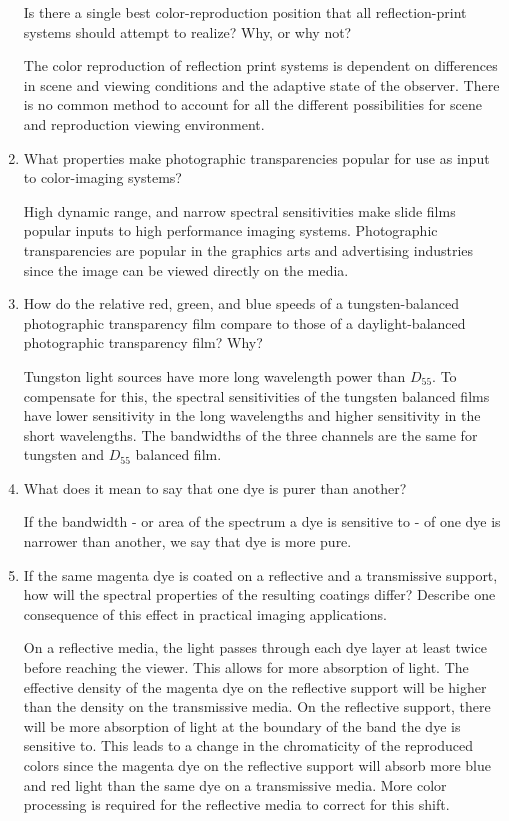 \begin{enumerate}
  Is there a single best color-reproduction position that all reflection-print systems should attempt to realize? Why, or why not? \newline
 \par  The color reproduction of reflection print systems is dependent on differences in scene and viewing conditions and the adaptive state of the observer.  There is no common method to account for all the different possibilities for scene and reproduction viewing environment.
 \item
 What properties make photographic transparencies popular for use as input to color-imaging systems? \newline
 \par High dynamic range, and narrow spectral sensitivities make slide films popular inputs to high performance imaging systems.  Photographic transparencies are popular in the graphics arts and advertising industries since the image can be viewed directly on the media. \newline
 \item
  How do the relative red, green, and blue speeds of a tungsten-balanced photographic transparency film compare to those of a daylight-balanced photographic transparency film? Why? \newline
 \par Tungston light sources have more long wavelength power than $D_{55}$.  To compensate for this, the spectral sensitivities of the tungsten balanced films have lower sensitivity in the long wavelengths and higher sensitivity in the short wavelengths.  The bandwidths of the three channels are the same for tungsten and $D_{55}$ balanced film. \newline
 \item
  What does it mean to say that one dye is purer than another? \newline
 \par If the bandwidth - or area of the spectrum a dye is sensitive to - of one dye is narrower than another, we say that dye is more pure. \newline
 \item
   If the same magenta dye is coated on a reflective and a transmissive support, how will the spectral properties of the resulting coatings differ? Describe one consequence of this effect in practical imaging applications. \newline
 \par On a reflective media, the light passes through each dye layer at least twice before reaching the viewer.  This allows for more absorption of light.  The effective density of the magenta dye on the reflective support will be higher than the density on the transmissive media. On the reflective support, there will be more absorption of light at the boundary of the band the dye is sensitive to.  This leads to a change in the chromaticity of the reproduced colors since the magenta dye on the reflective support will absorb more blue and red light than the same dye on a transmissive media.  More color processing is required for the reflective media to correct for this shift. \newline

\end{enumerate}
